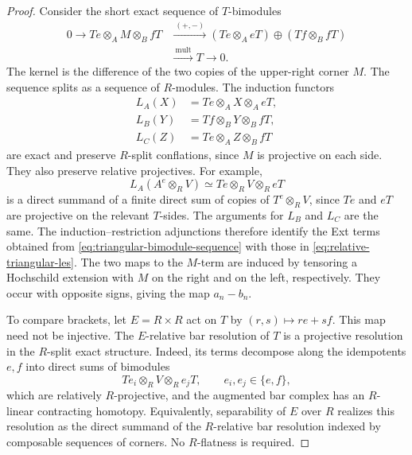 \documentclass[12pt,a4paper,english,reqno]{amsart}
\numberwithin{equation}{section}
\theoremstyle{plain}
\theoremstyle{definition}
\begin{document}
\begin{proof}
Consider the short exact sequence of $T$-bimodules
\begin{equation}
 \begin{aligned}
 0\longrightarrow Te\otimes_A M\otimes_B fT
  &\xrightarrow{\ (+,-)\ }
       (Te\otimes_A eT)\oplus(Tf\otimes_B fT)\\
  &\xrightarrow{\ \mathrm{mult}\ }
       T\longrightarrow0.
 \end{aligned}
 \label{eq:triangular-bimodule-sequence}
\end{equation}
The kernel is the difference of the two copies of the upper-right
corner $M$.  The sequence splits as a sequence of $R$-modules.
The induction functors
\[
 \begin{split}
 L_A(X)&=Te\otimes_A X\otimes_A eT,\\
 L_B(Y)&=Tf\otimes_B Y\otimes_B fT,\\
 L_C(Z)&=Te\otimes_A Z\otimes_B fT
 \end{split}
\]
are exact and preserve $R$-split conflations, since $M$ is
projective on each side.
They also preserve relative projectives.  For example,
\[
 L_A(A^e\otimes_R V)\simeq Te\otimes_R V\otimes_R eT
\]
is a direct summand of a finite direct sum of copies of
$T^e\otimes_R V$, since $Te$ and $eT$ are projective on the
relevant $T$-sides.  The arguments for $L_B$ and $L_C$ are the same.
The induction--restriction adjunctions therefore identify
the Ext terms obtained from \eqref{eq:triangular-bimodule-sequence}
with those in \eqref{eq:relative-triangular-les}.  The two maps to the $M$-term are induced by tensoring a Hochschild
extension with $M$ on the right and on the left, respectively.
They occur with opposite signs, giving the map $a_n-b_n$.

To compare brackets, let $E=R\times R$ act on $T$ by
$(r,s)\mapsto re+sf$.  This map need not be injective.
The $E$-relative bar resolution of $T$ is a projective resolution in
the $R$-split exact structure.  Indeed, its terms decompose along
the idempotents $e,f$ into direct sums of bimodules
\[
 Te_i\otimes_R V\otimes_R e_jT,
 \qquad e_i,e_j\in\{e,f\},
\]
which are relatively $R$-projective, and the augmented bar complex
has an $R$-linear contracting homotopy.  Equivalently, separability of $E$ over $R$ realizes this resolution
as the direct summand of the $R$-relative bar resolution indexed by
composable sequences of corners.  No $R$-flatness is required.


\end{proof}
\end{document}
